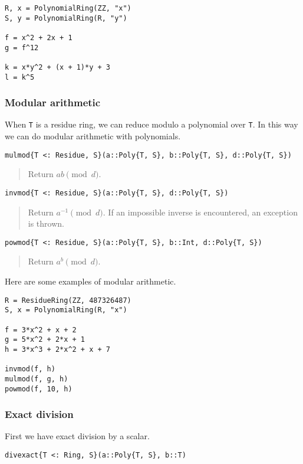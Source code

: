 \documentclass[a4paper,10pt]{article}
\newcommand{\code}{\lstinline}
\newcommand{\desc}[1]{\vspace{-3mm}\begin{quote}#1\end{quote}}
\begin{document}
{{{\begin{lstlisting}
R, x = PolynomialRing(ZZ, "x")
S, y = PolynomialRing(R, "y")

f = x^2 + 2x + 1
g = f^12

k = x*y^2 + (x + 1)*y + 3
l = k^5
\end{lstlisting}

\subsubsection{Modular arithmetic}

When \code{T} is a residue ring, we can reduce modulo a polynomial over
\code{T}. In this way we can do modular arithmetic with polynomials.

\begin{lstlisting}
mulmod{T <: Residue, S}(a::Poly{T, S}, b::Poly{T, S}, d::Poly{T, S})
\end{lstlisting}

\desc{Return $ab \pmod{d}$.}

\begin{lstlisting}
invmod{T <: Residue, S}(a::Poly{T, S}, d::Poly{T, S})
\end{lstlisting}

\desc{Return $a^{-1} \pmod{d}$. If an impossible inverse is encountered, an
exception is thrown.}

\begin{lstlisting}
powmod{T <: Residue, S}(a::Poly{T, S}, b::Int, d::Poly{T, S})
\end{lstlisting}

\desc{Return $a^b \pmod{d}$.}

Here are some examples of modular arithmetic.

\begin{lstlisting}
R = ResidueRing(ZZ, 487326487)
S, x = PolynomialRing(R, "x")

f = 3*x^2 + x + 2
g = 5*x^2 + 2*x + 1
h = 3*x^3 + 2*x^2 + x + 7

invmod(f, h)
mulmod(f, g, h)
powmod(f, 10, h)
\end{lstlisting}

\subsubsection{Exact division}

First we have exact division by a scalar.

\begin{lstlisting}
divexact{T <: Ring, S}(a::Poly{T, S}, b::T)
\end{lstlisting}

}}}
\end{document}
